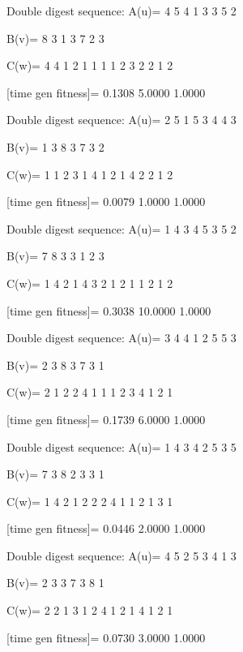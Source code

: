 Double digest sequence:
A(u)=
     4     5     4     1     3     3     5     2

B(v)=
     8     3     1     3     7     2     3

C(w)=
     4     4     1     2     1     1     1     1     2     3     2     2     1     2

[time gen fitness]=
    0.1308    5.0000    1.0000

Double digest sequence:
A(u)=
     2     5     1     5     3     4     4     3

B(v)=
     1     3     8     3     7     3     2

C(w)=
     1     1     2     3     1     4     1     2     1     4     2     2     1     2

[time gen fitness]=
    0.0079    1.0000    1.0000

Double digest sequence:
A(u)=
     1     4     3     4     5     3     5     2

B(v)=
     7     8     3     3     1     2     3

C(w)=
     1     4     2     1     4     3     2     1     2     1     1     2     1     2

[time gen fitness]=
    0.3038   10.0000    1.0000

Double digest sequence:
A(u)=
     3     4     4     1     2     5     5     3

B(v)=
     2     3     8     3     7     3     1

C(w)=
     2     1     2     2     4     1     1     1     2     3     4     1     2     1

[time gen fitness]=
    0.1739    6.0000    1.0000

Double digest sequence:
A(u)=
     1     4     3     4     2     5     3     5

B(v)=
     7     3     8     2     3     3     1

C(w)=
     1     4     2     1     2     2     2     4     1     1     2     1     3     1

[time gen fitness]=
    0.0446    2.0000    1.0000

Double digest sequence:
A(u)=
     4     5     2     5     3     4     1     3

B(v)=
     2     3     3     7     3     8     1

C(w)=
     2     2     1     3     1     2     4     1     2     1     4     1     2     1

[time gen fitness]=
    0.0730    3.0000    1.0000

